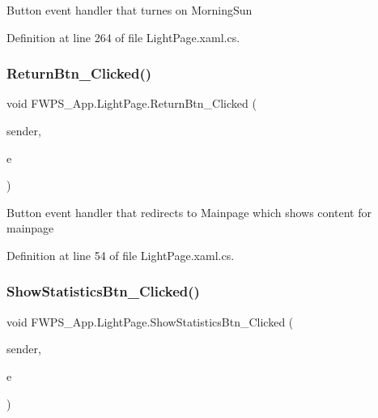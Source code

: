 Button event handler that turnes on Morning\+Sun 

Definition at line 264 of file Light\+Page.\+xaml.\+cs.

\mbox{\label{class_f_w_p_s___app_1_1_light_page_a175b88d56e180cb789369cbfd8b19049}} 
\subsubsection{\texorpdfstring{Return\+Btn\+\_\+\+Clicked()}{ReturnBtn\_Clicked()}}
{\footnotesize\ttfamily void F\+W\+P\+S\+\_\+\+App.\+Light\+Page.\+Return\+Btn\+\_\+\+Clicked (\begin{DoxyParamCaption}\item[{object}]{sender,  }\item[{Event\+Args}]{e }\end{DoxyParamCaption})\hspace{0.3cm}{\ttfamily [private]}}

Button event handler that redirects to Mainpage which shows content for mainpage 

Definition at line 54 of file Light\+Page.\+xaml.\+cs.

\mbox{\label{class_f_w_p_s___app_1_1_light_page_abccdee54e45269de159d5f4cbe64c5f0}} 
\subsubsection{\texorpdfstring{Show\+Statistics\+Btn\+\_\+\+Clicked()}{ShowStatisticsBtn\_Clicked()}}
{\footnotesize\ttfamily void F\+W\+P\+S\+\_\+\+App.\+Light\+Page.\+Show\+Statistics\+Btn\+\_\+\+Clicked (\begin{DoxyParamCaption}\item[{object}]{sender,  }\item[{Event\+Args}]{e }\end{DoxyParamCaption})\hspace{0.3cm}{\ttfamily [private]}}


